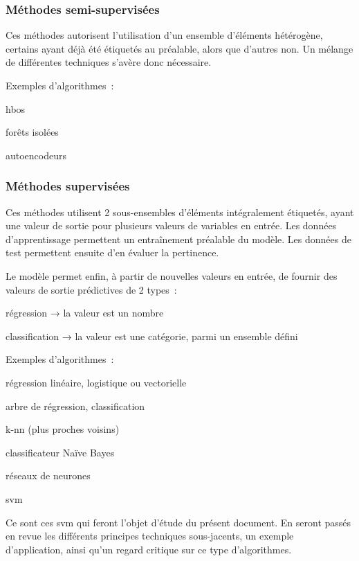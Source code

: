 \subsubsection{Méthodes semi-supervisées}

Ces méthodes autorisent l’utilisation d’un ensemble d’éléments hétérogène,
certains ayant déjà été étiquetés au préalable, alors que d’autres non.
Un mélange de différentes techniques s’avère donc nécessaire.

Exemples d’algorithmes :
\begin{itmz}
\item{\gls{hbos}}
\item{forêts isolées}
\item{autoencodeurs}
\end{itmz}

\subsubsection{Méthodes supervisées}

Ces méthodes utilisent 2 sous-ensembles d’éléments intégralement étiquetés,
ayant une valeur de sortie pour plusieurs valeurs de variables en entrée.
Les données d’apprentissage permettent un entraînement préalable du modèle.
Les données de test permettent ensuite d’en évaluer la pertinence.

Le modèle permet enfin, à partir de nouvelles valeurs en entrée,
de fournir des valeurs de sortie prédictives de 2 types :
\begin{itmz}
\item{régression → la valeur est un nombre}
\item{classification → la valeur est une catégorie, parmi un ensemble défini}
\end{itmz}

Exemples d’algorithmes :
\begin{itmz}
\item{régression linéaire, logistique ou vectorielle}
\item{arbre de régression, classification}
\item{k-\gls{nn} (plus proches voisins)}
\item{classificateur Naïve Bayes}
\item{réseaux de neurones}
\item{\gls{svm}}
\end{itmz}

Ce sont ces \gls{svm} qui feront l’objet d’étude du présent document.
En seront passés en revue les différents principes techniques sous-jacents,
un exemple d’application, ainsi qu’un regard critique sur ce type d’algorithmes.

\pagebreak
